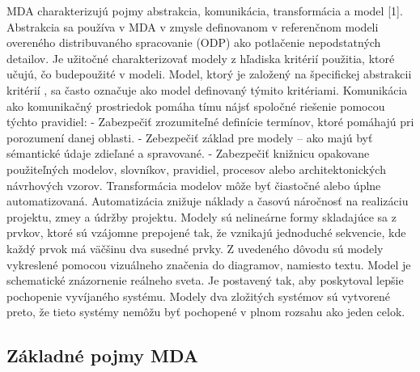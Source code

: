 \documentclass[a4paper]{feidippp}
\begin{document}
MDA charakterizujú pojmy abstrakcia, komunikácia, transformácia a model [1].
Abstrakcia sa používa v MDA v zmysle definovanom v referenčnom modeli overeného distribuvaného spracovanie (ODP) ako potlačenie nepodstatných detailov. Je užitočné charakterizovať modely z hľadiska kritérií použitia, ktoré učujú, čo budepoužité v modeli.  Model, ktorý je založený na špecifickej abstrakcii kritérií , sa často označuje ako model definovaný týmito kritériami.
Komunikácia ako komunikačný prostriedok pomáha tímu nájsť spoločné riešenie pomocou týchto pravidiel:
-	Zabezpečiť zrozumiteľné definície termínov, ktoré pomáhajú pri porozumení danej oblasti.
-	Zebezpečiť základ pre modely – ako majú byť  sémantické údaje zdieľané a spravované.
-	Zabezpečiť knižnicu opakovane použiteľných modelov, slovníkov, pravidiel, procesov alebo architektonických návrhových vzorov.
Transformácia modelov môže byť čiastočné alebo úplne automatizovaná. Automatizácia znižuje náklady a časovú náročnosť na realizáciu projektu, zmey a údržby projektu.
Modely sú nelineárne formy skladajúce sa z prvkov, ktoré sú vzájomne prepojené tak, že vznikajú jednoduché sekvencie, kde každý prvok má väčšinu dva susedné prvky.  Z uvedeného dôvodu sú modely vykreslené pomocou vizuálneho značenia do diagramov, namiesto textu. Model je schematické znázornenie reálneho sveta. Je postavený tak, aby poskytoval lepšie pochopenie vyvíjaného systému. Modely dva zložitých systémov sú vytvorené preto, že tieto systémy nemôžu byť pochopené v plnom rozsahu ako jeden celok. 


\subsection{	Základné pojmy MDA}
\end{document}

